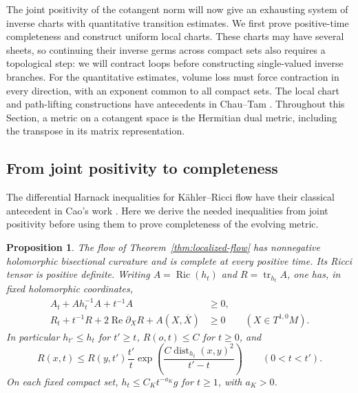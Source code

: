 \documentclass[11pt]{article}
\newtheorem{proposition}[theorem]{Proposition}
\theoremstyle{definition}
\theoremstyle{remark}
\DeclareMathOperator{\Ric}{Ric}
\DeclareMathOperator{\tr}{tr}
\DeclareMathOperator{\dist}{dist}
\numberwithin{equation}{section}
\begin{document}
The joint positivity of the cotangent norm will now give an exhausting
system of inverse charts with quantitative transition estimates.
We first prove positive-time completeness and construct uniform local
charts.  These charts may have several sheets, so continuing their
inverse germs across compact sets also requires a topological step:
we will contract loops before constructing single-valued inverse branches.
For the quantitative estimates, volume loss must force contraction in
every direction, with an exponent common to all compact sets.
The local chart and path-lifting constructions have antecedents in Chau--Tam
\cite[Section~2]{ChauTamSimply}\cite[Sections~2--3]{ChauTamStein}.
Throughout this Section, a metric on a cotangent space is the Hermitian
dual metric, including the transpose in its matrix representation.

\subsection{From joint positivity to completeness}

The differential Harnack inequalities for K\"ahler--Ricci flow have
their classical antecedent in Cao's work \cite{CaoHarnack}.
Here we derive the needed inequalities from joint positivity before
using them to prove completeness of the evolving metric.

\begin{proposition}\label{prop:harnack-completeness}
The flow of Theorem~\ref{thm:localized-flow} has nonnegative holomorphic
bisectional curvature and is complete at every positive time.  Its
Ricci tensor is positive definite.  Writing $A=\Ric(h_t)$ and
$R=\tr_{h_t}A$, one has, in fixed holomorphic coordinates,
\begin{align}
 A_t+A h_t^{-1}A+t^{-1}A&\ge0,
 \label{chart:matrix-harnack}\\
 R_t+t^{-1}R+2\operatorname{Re}\partial_XR+A(X,\overline X)&\ge0
 \qquad(X\in T^{1,0}M).
 \label{chart:scalar-harnack}
\end{align}
In particular $h_{t'}\le h_t$ for $t'\ge t$, $R(o,t)\le C$ for
$t\ge0$, and
\begin{equation}\label{chart:integrated-harnack}
 R(x,t)\le R(y,t')\frac{t'}t
 \exp\!\left(\frac{C\dist_{h_t}(x,y)^2}{t'-t}\right)
 \qquad(0<t<t').
\end{equation}
On each fixed compact set, $h_t\le C_Kt^{-a_K}g$ for $t\ge1$, with
$a_K>0$.
\end{proposition}
\end{document}
